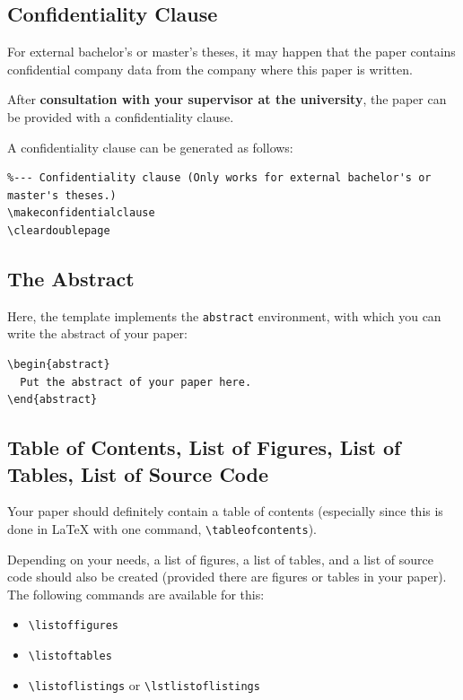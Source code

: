 \documentclass[pdftex,a4paper]{scrartcl}
\begin{document}
\subsection{Confidentiality Clause}

For external bachelor's or master's theses, it may happen that the paper
contains confidential company data from the company where this paper is written.

After \textbf{consultation with your supervisor at the university}, the paper
can be provided with a confidentiality clause.


A confidentiality clause can be generated as follows:

\begin{verbatim}
%--- Confidentiality clause (Only works for external bachelor's or master's theses.)
\makeconfidentialclause
\cleardoublepage
\end{verbatim}


\subsection{The Abstract}

Here, the template implements the \verb+abstract+ environment, with which you can write the abstract of your paper:

\begin{verbatim}
\begin{abstract}
  Put the abstract of your paper here.
\end{abstract}
\end{verbatim}


\subsection{Table of Contents, List of Figures, List of Tables, List of Source Code}

Your paper should definitely contain a table of contents (especially since this is done in
\LaTeX{} with one command, \verb+\tableofcontents+).

Depending on your needs, a list of figures, a list of tables, and a list of source code should also be created (provided there are figures or tables in your paper). The following commands are available for this:
\begin{itemize}
  \item \verb+\listoffigures+
  \item \verb+\listoftables+
  \item \verb+\listoflistings+ or \verb+\lstlistoflistings+
\end{itemize}
\end{document}
